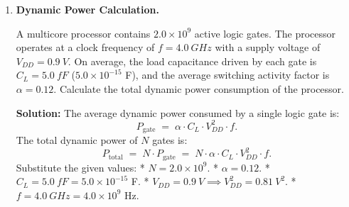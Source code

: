 \documentclass[12pt, a4paper]{book}
\begin{document}
\begin{problembox}
\begin{enumerate}[label=\textbf{E\arabic*.}]
\begin{center}
        \end{center}
        
        The switching state table:
        * **$A=0, B=0$:** Both pMOS are ON; both nMOS are OFF. Output is pulled to $V_{DD}$ ($Y=1$).
        * **$A=0, B=1$:** pMOS $A$ is ON, pMOS $B$ is OFF; nMOS $A$ is OFF, nMOS $B$ is ON. Since the series nMOS path is broken, and the parallel pMOS path is active, the output is pulled to $V_{DD}$ ($Y=1$).
        * **$A=1, B=0$:** pMOS $A$ is OFF, pMOS $B$ is ON; nMOS $A$ is ON, nMOS $B$ is OFF. The output is pulled to $V_{DD}$ ($Y=1$).
        * **$A=1, B=1$:** Both pMOS are OFF; both nMOS are ON. The series pull-down path is complete, pulling the output to Ground ($Y=0$).
        
  \item \textbf{Dynamic Power Calculation.}
  
        A multicore processor contains $2.0 \times 10^9$ active logic gates.
        The processor operates at a clock frequency of $f = \SI{4.0}{GHz}$ with a supply voltage of $V_{DD} = \SI{0.9}{V}$.
        On average, the load capacitance driven by each gate is $C_L = \SI{5.0}{fF}$ ($5.0 \times 10^{-15}$ F), and the average switching activity factor is $\alpha = 0.12$.
        Calculate the total dynamic power consumption of the processor.
        
        \textbf{Solution:}
        The average dynamic power consumed by a single logic gate is:
        \[
          P_{\text{gate}} \;=\; \alpha \cdot C_L \cdot V_{DD}^2 \cdot f.
        \]
        The total dynamic power of $N$ gates is:
        \[
          P_{\text{total}} \;=\; N \cdot P_{\text{gate}} \;=\; N \cdot \alpha \cdot C_L \cdot V_{DD}^2 \cdot f.
        \]
        Substitute the given values:
        * $N = 2.0 \times 10^9$.
        * $\alpha = 0.12$.
        * $C_L = \SI{5.0}{fF} = 5.0 \times 10^{-15}$ F.
        * $V_{DD} = \SI{0.9}{V} \implies V_{DD}^2 = \SI{0.81}{V^2}$.
        * $f = \SI{4.0}{GHz} = 4.0 \times 10^9$ Hz.
        

\end{enumerate}
\end{problembox}
\end{document}
